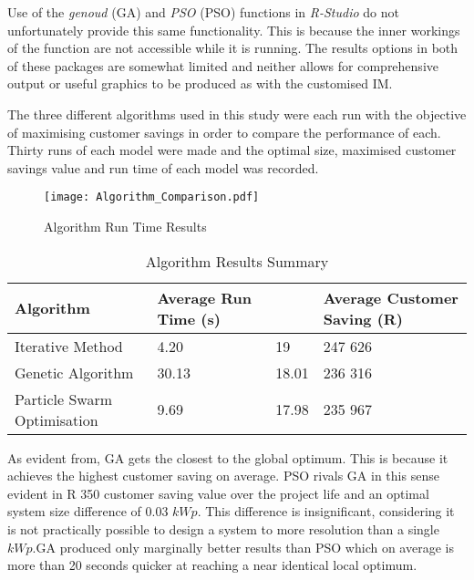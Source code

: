 \documentclass[a4paper,11pt,fleqn]{report}
\begin{document}
Use of the \textit{genoud} (\ac{GA}) and \textit{PSO} (\ac{PSO}) functions in \textit{R-Studio} do not unfortunately provide this same functionality. This is because the inner workings of the function are not accessible while it is running. The results options in both of these packages are somewhat limited and neither allows for comprehensive output or useful graphics to be produced as with the customised \ac{IM}.

The three different algorithms used in this study were each run with the objective of maximising customer savings in order to compare the performance of each. Thirty runs of each model were made and the optimal size, maximised customer savings value and run time of each model was recorded.

\begin{figure}[H]
\begin{center}
\texttt{[image: Algorithm\_Comparison.pdf]}
\caption{Algorithm Run Time Results}
\label{fig: Algorithm Run Time Results}
\end{center}
\end{figure}

\begin{table}[H]
\caption {Algorithm Results Summary} \label{table:	 AlgSum} 
\begin{center}
\begin{tabular}{p{5cm} p{2cm} p{2.5cm} p{2.5cm}}\toprule
    {\textbf{Algorithm}} & {\textbf{Average Run Time (s)}} & {\textbf{Average optimal system size} & {\textbf{Average Customer Saving (R)}}\\ \midrule
    Iterative Method & 4.20 & 19 & 247 626\\
	Genetic Algorithm  & 30.13 & 18.01 & 236 316\\
    Particle Swarm Optimisation & 9.69 & 17.98 & 235 967\\ \bottomrule
\end{tabular}
\end{center}
\end{table}

As evident from, \ac{GA} gets the closest to the global optimum. This is because it achieves the highest customer saving on average. \ac{PSO} rivals \ac{GA} in this sense evident in R 350 customer saving value over the project life and an optimal system size difference of 0.03 $kWp$. This difference is insignificant, considering it is not practically possible to design a system to more resolution than a single $kWp$.\ac{GA} produced only marginally better results than \ac{PSO} which on average is more than 20 seconds quicker at reaching a near identical local optimum.
\end{document}
